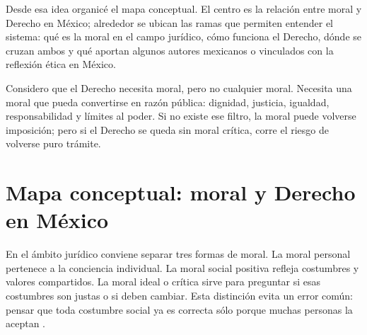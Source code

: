 \documentclass[
	spanish,
	letterpaper, oneside
]{article}
\begin{document}
Desde esa idea organicé el mapa conceptual. El centro es la relación entre moral y Derecho en México; alrededor se ubican las ramas que permiten entender el sistema: qué es la moral en el campo jurídico, cómo funciona el Derecho, dónde se cruzan ambos y qué aportan algunos autores mexicanos o vinculados con la reflexión ética en México.

Considero que el Derecho necesita moral, pero no cualquier moral. Necesita una moral que pueda convertirse en razón pública: dignidad, justicia, igualdad, responsabilidad y límites al poder. Si no existe ese filtro, la moral puede volverse imposición; pero si el Derecho se queda sin moral crítica, corre el riesgo de volverse puro trámite.

%
\section{Mapa conceptual: moral y Derecho en México}

En el ámbito jurídico conviene separar tres formas de moral. La moral personal pertenece a la conciencia individual. La moral social positiva refleja costumbres y valores compartidos. La moral ideal o crítica sirve para preguntar si esas costumbres son justas o si deben cambiar. Esta distinción evita un error común: pensar que toda costumbre social ya es correcta sólo porque muchas personas la aceptan \citep{ronquilloarmasEticaGeneralProfesional2018,singerCompendioEtica1995}.
\end{document}
